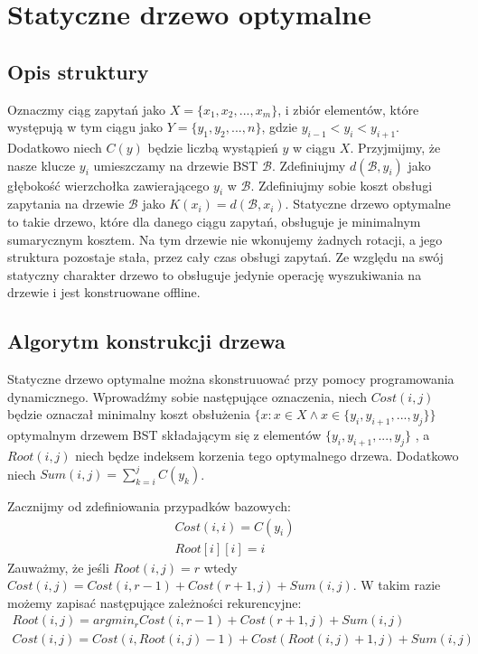 \documentclass[declaration,shortabstract]{iithesis}
\theoremstyle{thm}
\theoremstyle{remark}
\theoremstyle{plain}
\theoremstyle{plain}
\theoremstyle{plain}
\begin{document}
\chapter{Statyczne drzewo optymalne}

\section{Opis struktury}

Oznaczmy ciąg zapytań jako \( X = \{x_1, x_2, ..., x_m\}\), i zbiór elementów, które występują w tym ciągu jako \( Y = \{y_1, y_2, ..., n\}\), gdzie \(y_{i-1} < y_i < y_{i+1}\). 
Dodatkowo niech \(C(y)\) będzie liczbą wystąpień \(y\) w ciągu \(X\). 
Przyjmijmy, że nasze klucze \(y_i\) umieszczamy na drzewie BST \(\mathcal{B}\). Zdefiniujmy \( d(\mathcal{B}, y_i)\) jako głębokość wierzchołka zawierającego \(y_i\) w \(\mathcal{B}\). 
Zdefiniujmy sobie koszt obsługi zapytania na drzewie \(\mathcal{B}\) jako \(K(x_i) = d(\mathcal{B}, x_i)\).
Statyczne drzewo optymalne to takie drzewo, które dla danego ciągu zapytań, obsługuje je minimalnym sumarycznym kosztem. 
Na tym drzewie nie wkonujemy żadnych rotacji, a jego struktura pozostaje stała, przez cały czas obsługi zapytań. 
Ze względu na swój statyczny charakter drzewo to obsługuje jedynie operację wyszukiwania na drzewie i jest konstruowane offline.

\section{Algorytm konstrukcji drzewa} \label{static_desc}

Statyczne drzewo optymalne można skonstruuować przy pomocy programowania dynamicznego. Wprowadźmy sobie następujące oznaczenia, niech \(Cost(i, j)\) będzie oznaczał minimalny koszt obsłużenia \(\{ x : x\in X \wedge x\in \{y_i, y_{i+1}, ..., y_{j}\}\}\) optymalnym drzewem BST składającym się z elementów \(\{y_i, y_{i+1}, ..., y_{j}\}\) , a \(Root(i, j)\) niech będze indeksem korzenia tego optymalnego drzewa. Dodatkowo niech \(Sum(i, j) = \sum_{k = i}^j C(y_k)\).

Zacznijmy od zdefiniowania przypadków bazowych: 
\begin{align*}
Cost(i, i) = C(y_i)\\
Root[i][i] = i
\end{align*}
Zauważmy, że jeśli \(Root(i, j) = r\) wtedy \(Cost(i, j) =  Cost(i, r-1) + Cost(r+1, j) + Sum(i, j)\). W takim razie możemy zapisać następujące zależności rekurencyjne:
\begin{align*}
Root(i, j) = argmin_r Cost(i, r-1) + Cost(r+1, j) + Sum(i, j)\\
Cost(i, j) =  Cost(i, Root(i, j)-1) + Cost(Root(i, j)+1, j) + Sum(i, j)\\
\end{align*}
\end{document}
